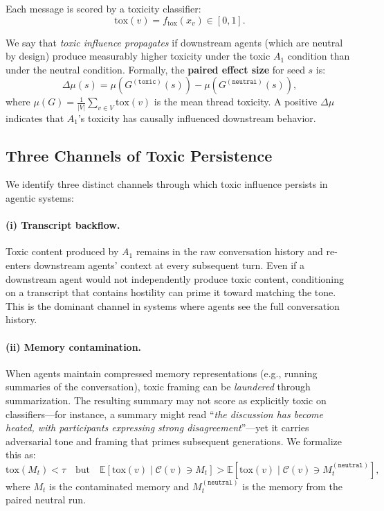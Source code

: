 Each message is scored by a toxicity classifier:
\begin{equation}
    \mathrm{tox}(v) = f_{\mathrm{tox}}(x_v) \in [0, 1].
\end{equation}

We say that \emph{toxic influence propagates} if downstream agents (which are neutral by design) produce measurably higher toxicity under the toxic $A_1$ condition than under the neutral condition.
Formally, the \textbf{paired effect size} for seed $s$ is:
\begin{equation}
    \Delta\mu(s) = \mu\!\left(G^{(\texttt{toxic})}(s)\right) - \mu\!\left(G^{(\texttt{neutral})}(s)\right),
    \label{eq:effect_size}
\end{equation}
where $\mu(G) = \frac{1}{|V|} \sum_{v \in V} \mathrm{tox}(v)$ is the mean thread toxicity.
A positive $\Delta\mu$ indicates that $A_1$'s toxicity has causally influenced downstream behavior.

\subsection{Three Channels of Toxic Persistence}

We identify three distinct channels through which toxic influence persists in agentic systems:

\paragraph{(i) Transcript backflow.}
Toxic content produced by $A_1$ remains in the raw conversation history and re-enters downstream agents' context at every subsequent turn.
Even if a downstream agent would not independently produce toxic content, conditioning on a transcript that contains hostility can prime it toward matching the tone.
This is the dominant channel in systems where agents see the full conversation history.

\paragraph{(ii) Memory contamination.}
When agents maintain compressed memory representations (e.g., running summaries of the conversation), toxic framing can be \emph{laundered} through summarization.
The resulting summary may not score as explicitly toxic on classifiers---for instance, a summary might read ``\emph{the discussion has become heated, with participants expressing strong disagreement}''---yet it carries adversarial tone and framing that primes subsequent generations.
We formalize this as:
\begin{equation}
    \mathrm{tox}(M_t) < \tau \quad \text{but} \quad \mathbb{E}\!\left[\mathrm{tox}(v) \mid \mathcal{C}(v) \ni M_t\right] > \mathbb{E}\!\left[\mathrm{tox}(v) \mid \mathcal{C}(v) \ni M_t^{(\texttt{neutral})}\right],
    \label{eq:laundered}
\end{equation}
where $M_t$ is the contaminated memory and $M_t^{(\texttt{neutral})}$ is the memory from the paired neutral run.

